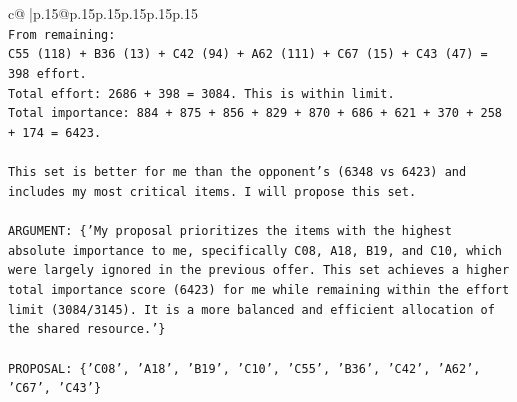 \documentclass{article}
\begin{document}
{\begin{supertabular}{c@{$\;$}|p{.15\linewidth}@{}p{.15\linewidth}p{.15\linewidth}p{.15\linewidth}p{.15\linewidth}p{.15\linewidth}}
{{{\\ 
\texttt{From remaining:} \\
\texttt{C55 (118) + B36 (13) + C42 (94) + A62 (111) + C67 (15) + C43 (47) = 398 effort.} \\
\texttt{Total effort: 2686 + 398 = 3084. This is within limit.} \\
\texttt{Total importance: 884 + 875 + 856 + 829 + 870 + 686 + 621 + 370 + 258 + 174 = 6423.} \\
\\ 
\texttt{This set is better for me than the opponent's (6348 vs 6423) and includes my most critical items. I will propose this set.} \\
\\ 
\texttt{ARGUMENT: \{'My proposal prioritizes the items with the highest absolute importance to me, specifically C08, A18, B19, and C10, which were largely ignored in the previous offer. This set achieves a higher total importance score (6423) for me while remaining within the effort limit (3084/3145). It is a more balanced and efficient allocation of the shared resource.'\}} \\
\\ 
\texttt{PROPOSAL: \{'C08', 'A18', 'B19', 'C10', 'C55', 'B36', 'C42', 'A62', 'C67', 'C43'\}} \\
            }
        }
    }
     \\ \\


\end{supertabular}}
\end{document}
